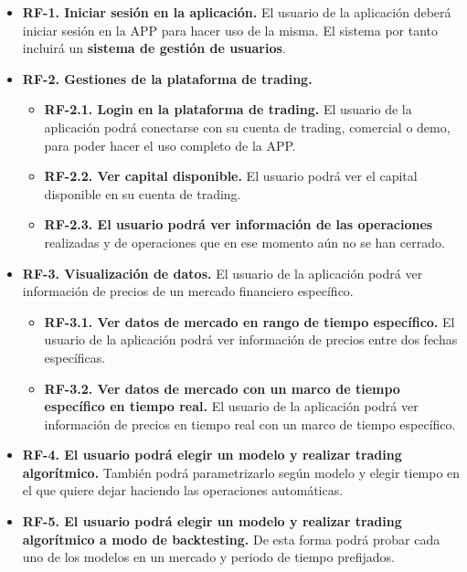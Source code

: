 \begin{itemize}
	
	\item \textbf{RF-1. Iniciar sesión en la aplicación.} El usuario de la aplicación deberá iniciar sesión en la APP para hacer uso de la misma. El sistema por tanto incluirá un \textbf{sistema de gestión de usuarios}.
	
	\item \textbf{RF-2. Gestiones de la plataforma de trading.} 
	\begin{itemize}
		\item \textbf{RF-2.1. Login en la plataforma de trading.} El usuario de la aplicación podrá conectarse con su cuenta de trading, comercial o demo, para poder hacer el uso completo de la APP.
		\item \textbf{RF-2.2. Ver capital disponible.} El usuario podrá ver el capital disponible en su cuenta de trading.
		\item \textbf{RF-2.3. El usuario podrá ver información de las operaciones} realizadas y de operaciones que en ese momento aún no se han cerrado.
	\end{itemize}

	\item \textbf{RF-3. Visualización de datos.} El usuario de la aplicación podrá ver información de precios de un mercado financiero específico.
	\begin{itemize}
		\item \textbf{RF-3.1. Ver datos de mercado en rango de tiempo específico.} El usuario de la aplicación podrá ver información de precios entre dos fechas específicas.
		\item \textbf{RF-3.2. Ver datos de mercado con un marco de tiempo específico en tiempo real.} El usuario de la aplicación podrá ver información de precios en tiempo real con un marco de tiempo específico.
	\end{itemize}

	\item \textbf{RF-4. El usuario podrá elegir un modelo y realizar trading algorítmico.} También podrá parametrizarlo según modelo y elegir tiempo en el que quiere dejar haciendo las operaciones automáticas. 

	\item \textbf{RF-5. El usuario podrá elegir un modelo y realizar trading algorítmico a modo de backtesting.} De esta forma podrá probar cada uno de los modelos en un mercado y periodo de tiempo prefijados.
	
\end{itemize}

